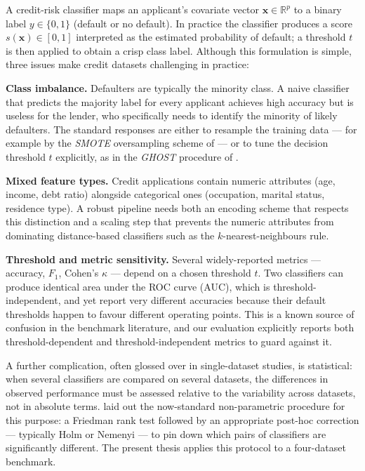 A credit-risk classifier maps an applicant's covariate vector
$\mathbf{x}\in\mathbb{R}^{p}$ to a binary label
$y\in\{0,1\}$ (default or no default). In practice the classifier
produces a score $s(\mathbf{x})\in[0,1]$ interpreted as the estimated
probability of default; a threshold $t$ is then applied to obtain a
crisp class label. Although this formulation is simple, three issues
make credit datasets challenging in practice:

\textbf{Class imbalance.} Defaulters are typically the minority class.
A naive classifier that predicts the majority label for every
applicant achieves high accuracy but is useless for the lender, who
specifically needs to identify the minority of likely defaulters.
The standard responses are either to resample the training data ---
for example by the \emph{SMOTE} oversampling scheme of
\citet{chawla2002smote} --- or to tune the decision threshold $t$
explicitly, as in the \emph{GHOST} procedure of
\citet{esposito2021ghost}.

\textbf{Mixed feature types.} Credit applications contain numeric
attributes (age, income, debt ratio) alongside categorical ones
(occupation, marital status, residence type). A robust pipeline
needs both an encoding scheme that respects this distinction and a
scaling step that prevents the numeric attributes from dominating
distance-based classifiers such as the $k$-nearest-neighbours rule.

\textbf{Threshold and metric sensitivity.} Several widely-reported
metrics --- accuracy, $F_1$, Cohen's $\kappa$ --- depend on a chosen
threshold $t$. Two classifiers can produce identical area under the
ROC curve (AUC), which is threshold-independent, and yet report very
different accuracies because their default thresholds happen to favour
different operating points. This is a known source of confusion in
the benchmark literature, and our evaluation
explicitly reports both threshold-dependent and threshold-independent
metrics to guard against it.

A further complication, often glossed over in single-dataset studies,
is statistical: when several classifiers are compared on several
datasets, the differences in observed performance must be assessed
relative to the variability across datasets, not in absolute terms.
\citet{demvsar2006statistical} laid out the now-standard
non-parametric procedure for this purpose: a Friedman rank test
followed by an appropriate post-hoc correction --- typically Holm
\citep{holm1979simple} or Nemenyi --- to pin down which pairs of
classifiers are significantly different. The present thesis applies
this protocol to a four-dataset benchmark.

